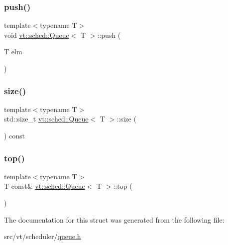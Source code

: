 \mbox{\label{structvt_1_1sched_1_1_queue_a5079f0b8b665ec528767a12ab210d1be}} 
\subsubsection{\texorpdfstring{push()}{push()}}
{\footnotesize\ttfamily template$<$typename T$>$ \\
void \hyperlink{structvt_1_1sched_1_1_queue}{vt\+::sched\+::\+Queue}$<$ T $>$\+::push (\begin{DoxyParamCaption}\item[{T}]{elm }\end{DoxyParamCaption})\hspace{0.3cm}{\ttfamily [inline]}}

\mbox{\label{structvt_1_1sched_1_1_queue_a0d5cd0a31703541be21f3bbd1590464e}} 
\subsubsection{\texorpdfstring{size()}{size()}}
{\footnotesize\ttfamily template$<$typename T$>$ \\
std\+::size\+\_\+t \hyperlink{structvt_1_1sched_1_1_queue}{vt\+::sched\+::\+Queue}$<$ T $>$\+::size (\begin{DoxyParamCaption}{ }\end{DoxyParamCaption}) const\hspace{0.3cm}{\ttfamily [inline]}}

\mbox{\label{structvt_1_1sched_1_1_queue_a636c676d2dc99d283ba3607e7ed5b390}} 
\subsubsection{\texorpdfstring{top()}{top()}}
{\footnotesize\ttfamily template$<$typename T$>$ \\
T const\& \hyperlink{structvt_1_1sched_1_1_queue}{vt\+::sched\+::\+Queue}$<$ T $>$\+::top (\begin{DoxyParamCaption}{ }\end{DoxyParamCaption})\hspace{0.3cm}{\ttfamily [inline]}}



The documentation for this struct was generated from the following file\+:\begin{DoxyCompactItemize}
\item 
src/vt/scheduler/\hyperlink{queue_8h}{queue.\+h}\end{DoxyCompactItemize}
